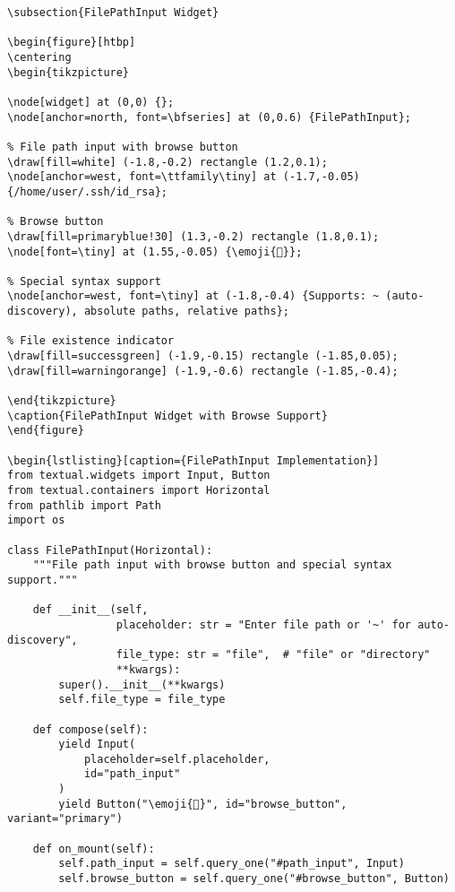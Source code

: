 \documentclass[11pt,a4paper]{article}
\newcommand{\emoji}[1]{{\emojifont #1}}
\begin{document}
\begin{lstlisting}[caption={ValidatedInput Implementation}]
\subsection{FilePathInput Widget}

\begin{figure}[htbp]
\centering
\begin{tikzpicture}

\node[widget] at (0,0) {};
\node[anchor=north, font=\bfseries] at (0,0.6) {FilePathInput};

% File path input with browse button
\draw[fill=white] (-1.8,-0.2) rectangle (1.2,0.1);
\node[anchor=west, font=\ttfamily\tiny] at (-1.7,-0.05) {/home/user/.ssh/id_rsa};

% Browse button
\draw[fill=primaryblue!30] (1.3,-0.2) rectangle (1.8,0.1);
\node[font=\tiny] at (1.55,-0.05) {\emoji{📁}};

% Special syntax support
\node[anchor=west, font=\tiny] at (-1.8,-0.4) {Supports: ~ (auto-discovery), absolute paths, relative paths};

% File existence indicator
\draw[fill=successgreen] (-1.9,-0.15) rectangle (-1.85,0.05);
\draw[fill=warningorange] (-1.9,-0.6) rectangle (-1.85,-0.4);

\end{tikzpicture}
\caption{FilePathInput Widget with Browse Support}
\end{figure}

\begin{lstlisting}[caption={FilePathInput Implementation}]
from textual.widgets import Input, Button
from textual.containers import Horizontal
from pathlib import Path
import os

class FilePathInput(Horizontal):
    """File path input with browse button and special syntax support."""
    
    def __init__(self, 
                 placeholder: str = "Enter file path or '~' for auto-discovery",
                 file_type: str = "file",  # "file" or "directory"
                 **kwargs):
        super().__init__(**kwargs)
        self.file_type = file_type
        
    def compose(self):
        yield Input(
            placeholder=self.placeholder,
            id="path_input"
        )
        yield Button("\emoji{📁}", id="browse_button", variant="primary")
        
    def on_mount(self):
        self.path_input = self.query_one("#path_input", Input)
        self.browse_button = self.query_one("#browse_button", Button)
        

\end{lstlisting}
\end{document}
